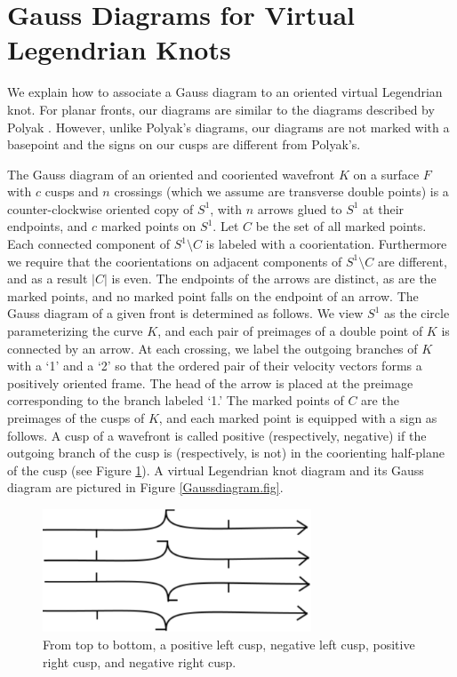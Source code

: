 \section{Gauss Diagrams for Virtual Legendrian Knots}\label{LegendrianGD}
We explain how to associate a Gauss diagram to an oriented virtual Legendrian knot.  For planar fronts, our diagrams are similar to the diagrams described by Polyak \cite{Polyak}.  However, unlike Polyak's diagrams, our diagrams are not marked with a basepoint and the signs on our cusps are different from Polyak's.  




The Gauss diagram of an oriented and cooriented wavefront $K$ on a surface $F$ with $c$ cusps and $n$ crossings (which we assume are transverse double points) is a counter-clockwise oriented copy of $S^1$, with $n$ arrows glued to $S^1$ at their endpoints, and $c$ marked points on $S^1$.  Let $C$ be the set of all marked points.  Each connected component of $S^1\setminus C$ is labeled with a coorientation.  Furthermore we require that the coorientations on adjacent components of $S^1\setminus C$ are different, and as a result $|C|$ is even.  The endpoints of the arrows are distinct, as are the marked points, and no marked point falls on the endpoint of an arrow.  The Gauss diagram of a given front is determined as follows.  We view $S^1$ as the circle parameterizing the curve $K$, and each pair of preimages of a double point of $K$ is connected by an arrow.  At each crossing, we label the outgoing branches of $K$ with a `1' and a `2' so that the ordered pair of their velocity vectors forms a positively oriented frame.  The head of the arrow is placed at the preimage corresponding to the branch labeled `1.'  The marked points of $C$ are the preimages of the cusps of $K$, and each marked point is equipped with a sign as follows.  A cusp of a wavefront is called positive (respectively, negative) if the outgoing branch of the cusp is (respectively, is not) in the coorienting half-plane of the cusp (see Figure \ref{cusps.fig}).  A virtual Legendrian knot diagram and its Gauss diagram are pictured in Figure \ref{Gaussdiagram.fig}.

\begin{figure}[htbp]
	\centering
	\includegraphics[width=8cm]{goodcusps}

	\caption{From top to bottom, a positive left cusp, negative left cusp, positive right cusp, and negative right cusp.}
	\label{cusps.fig}
\end{figure}

